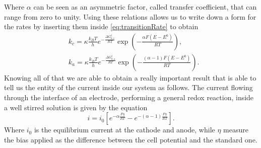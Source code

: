 Where $\alpha$ can be seen as an asymmetric factor, called transfer coefficient, that can range from zero to unity. Using these relations allows us to write down a form for the rates by inserting them inside \eqref{eq:transitionRate} to obtain
\begin{align}
    \label{eq:forwardRateC}
    &k_c = \kappa\frac{k_BT}{h}e^{-\frac{\Delta G^\ddagger_{0,c}}{RT}}\exp\left( -\frac{\alpha F(E-E^0)}{RT} \right), \\
    \label{eq:BackwardRateB}
    &k_a = \kappa\frac{k_BT}{h}e^{-\frac{\Delta G^\ddagger_{0,a}}{RT}}\exp\left( -\frac{(\alpha -1)F(E-E^0)}{RT} \right).
\end{align}
Knowing all of that we are able to obtain a really important result that is able to tell us the entity of the current inside our system as follows.
{
    The current flowing through the interface of an electrode, performing a general redox reaction, inside a well stirred solution is given by the equation
    \begin{equation}
        i = i_0\left[ e^{-\alpha\frac{F\eta}{RT}} - e^{-(\alpha - 1)\frac{F\eta}{RT}} \right].
    \end{equation}
    Where $i_0$ is the equilibrium current at the cathode and anode, while $\eta$ measure the bias applied as the difference between the cell potential and the standard one.
}
